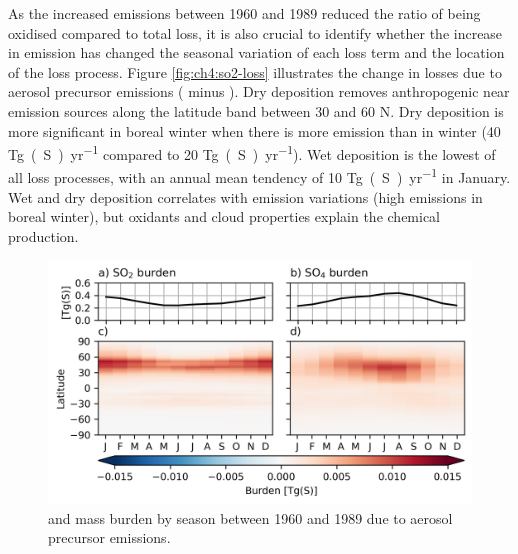 As the increased emissions between 1960 and 1989 reduced the ratio of  being oxidised compared to total loss, it is also crucial to identify whether the increase in emission has changed the seasonal variation of each loss term and the location of the loss process. Figure \ref{fig:ch4:so2-loss} illustrates the change in  losses due to aerosol precursor emissions (\histsst{} minus \sstpiaer{}). Dry deposition removes anthropogenic  near emission sources along the latitude band between 30 and 60 \textdegree N. Dry deposition is more significant in boreal winter when there is more emission than in winter (40 \unit{Tg(S)~yr^{-1}} compared to 20 \unit{Tg(S)~yr^{-1}}). Wet deposition is the lowest of all loss processes, with an annual mean tendency of 10 \unit{Tg(S)~yr^{-1}} in January. Wet and dry deposition correlates with emission variations (high emissions in boreal winter), but oxidants and cloud properties explain the chemical production.




\begin{figure}
    \centering
    \includegraphics{Chapter4/Figs/seasonal_s_burden_pothole.png}
    \caption[ and  mass burden by season between 1960 and 1989]{ and  mass burden by season between 1960 and 1989 due to aerosol precursor emissions.}
    \label{fig:ch4:seasonal-s-burden}
\end{figure}

